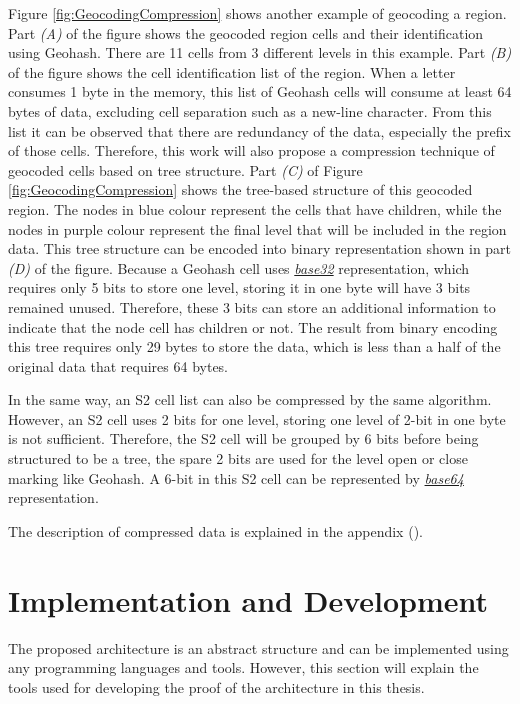 \npara Figure \ref{fig:GeocodingCompression} shows another example of geocoding a region.
Part \textit{(A)} of the figure shows the geocoded region cells and their identification using Geohash.
There are 11 cells from 3 different levels in this example.
Part \textit{(B)} of the figure shows the cell identification list of the region.
When a letter consumes 1 byte in the memory, this list of Geohash cells will consume at least 64 bytes of data, excluding cell separation such as a new-line character.
From this list it can be observed that there are redundancy of the data, especially the prefix of those cells.
Therefore, this work will also propose a compression technique of geocoded cells based on tree structure.
Part \textit{(C)} of Figure \ref{fig:GeocodingCompression} shows the tree-based structure of this geocoded region.
The nodes in blue colour represent the cells that have children, while the nodes in purple colour represent the final level that will be included in the region data.
This tree structure can be encoded into binary representation shown in part \textit{(D)} of the figure.
Because a Geohash cell uses \hyperref[Appendix-Base32]{\textit{base32}} representation, which requires only 5 bits to store one level, storing it in one byte will have 3 bits remained unused.
Therefore, these 3 bits can store an additional information to indicate that the node cell has children or not.
The result from binary encoding this tree requires only 29 bytes to store the data, which is less than a half of the original data that requires 64 bytes.

\npara In the same way, an S2 cell list can also be compressed by the same algorithm.
However, an S2 cell uses 2 bits for one level, storing one level of 2-bit in one byte is not sufficient.
Therefore, the S2 cell will be grouped by 6 bits before being structured to be a tree, the spare 2 bits are used for the level open or close marking like Geohash.
A 6-bit in this S2 cell can be represented by \hyperref[Appendix-Base32]{\textit{base64}} representation.

The description of compressed data is explained in the appendix (\textit{}).


\section{Implementation and Development} \label{Methodology-ExperimentDesign-Development}

\npara The proposed architecture is an abstract structure and can be implemented using any programming languages and tools.
However, this section will explain the tools used for developing the proof of the architecture in this thesis.


